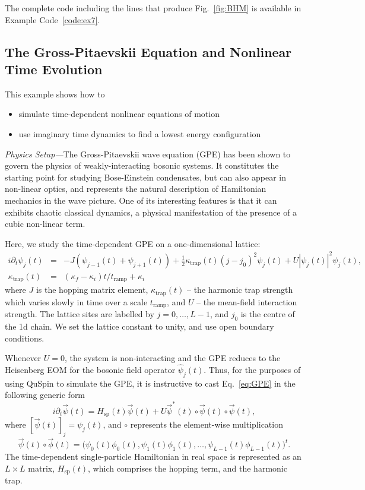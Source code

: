 \documentclass{SciPost}
\newcommand\0{\scalebox{-1}[1]{0}}
\begin{document}
The complete code including the lines that produce Fig.~\ref{fig:BHM} is available in Example Code~\ref{code:ex7}.

\subsection{The Gross-Pitaevskii Equation and Nonlinear Time Evolution}
\label{subsec:GP_dynamics}

This example shows how to
\begin{itemize}
	\item simulate time-dependent nonlinear equations of motion
	\item use imaginary time dynamics to find a lowest energy configuration
\end{itemize}

\noindent\emph{Physics Setup---}The Gross-Pitaevskii wave equation (GPE) has been shown to govern the physics of weakly-interacting bosonic systems. It constitutes the starting point for studying Bose-Einstein condensates, but can also appear in non-linear optics, and represents the natural description of Hamiltonian mechanics in the wave picture. One of its interesting features is that it can exhibits chaotic classical dynamics, a physical manifestation of the presence of a cubic non-linear term.

Here, we study the time-dependent GPE on a one-dimensional lattice:
\begin{eqnarray}
i\partial_t\psi_j(t) &=& -J\left( \psi_{j-1}(t) + \psi_{j+1}(t)\right) + \frac{1}{2}\kappa_\mathrm{trap}(t)(j-j_0)^2\psi_j(t) + U|\psi_j(t)|^2\psi_j(t), \nonumber \\
\kappa_\mathrm{trap}(t)&=&(\kappa_f-\kappa_i)t/t_\mathrm{ramp}+ \kappa_i
\label{eq:GPE}
\end{eqnarray}
where $J$ is the hopping matrix element, $\kappa_\mathrm{trap}(t)$ -- the harmonic trap strength which varies slowly in time over a scale $t_\mathrm{ramp}$, and $U$ -- the mean-field interaction strength. The lattice sites are labelled by $j=0,\dots,L-1$, and $j_0$ is the centre of the 1d chain. We set the lattice constant to unity, and use open boundary conditions.

Whenever $U=0$, the system is non-interacting and the GPE reduces to the Heisenberg EOM for the bosonic field operator $\hat\psi_j(t)$. Thus, for the purposes of using QuSpin to simulate the GPE, it is instructive to cast Eq.~\eqref{eq:GPE} in the following generic form
\begin{equation}
i\partial_t\vec{\psi}(t) = H_\mathrm{sp}(t)\vec{\psi}(t) + U \vec{\psi}^*(t)\circ \vec{\psi}(t)\circ \vec{\psi}(t), 
\end{equation}  
where $[\vec{\psi}(t)]_j = \psi_j(t)$, and $\circ$ represents the element-wise multiplication 
\begin{equation*}
\vec{\psi}(t)\circ \vec{\phi}(t) = \bigg(\psi_0(t)\phi_0(t), \psi_1(t)\phi_1(t),\dots, \psi_{L-1}(t)\phi_{L-1}(t) \bigg)^t.
\end{equation*}
The time-dependent single-particle Hamiltonian in real space is represented as an $L\times L$ matrix, $H_\mathrm{sp}(t)$, which comprises the hopping term, and the harmonic trap.
\end{document}
